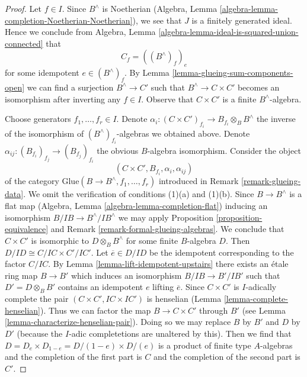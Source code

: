 \documentclass[10pt,a4paper]{amsart}
\theoremstyle{plain}
\theoremstyle{definition}
\theoremstyle{remark}
\numberwithin{equation}{subsection}
\begin{document}
\begin{proof}
Let $f \in I$. Since $B^\wedge$ is Noetherian (Algebra, Lemma
\ref{algebra-lemma-completion-Noetherian-Noetherian}),
we see that $J$ is a finitely generated ideal.
Hence we conclude from
Algebra, Lemma \ref{algebra-lemma-ideal-is-squared-union-connected}
that
$$
C_f = ((B^\wedge)_f)_e
$$
for some idempotent $e \in (B^\wedge)_f$. By
Lemma \ref{lemma-glueing-sum-components-open}
we can find a surjection $B^\wedge \to C'$
such that $B^\wedge \to C \times C'$ becomes an
isomorphism after inverting any $f \in I$.
Observe that $C \times C'$ is a finite $B^\wedge$-algebra.

\medskip\noindent
Choose generators $f_1, \ldots, f_r \in I$. Denote
$\alpha_i : (C \times C')_{f_i} \to B_{f_i} \otimes_B B^\wedge$
the inverse of the isomorphism of $(B^\wedge)_{f_i}$-algebras
we obtained above. Denote $\alpha_{ij} : (B_{f_i})_{f_j} \to (B_{f_j})_{f_i}$
the obvious $B$-algebra isomorphism.
Consider the object
$$
(C \times C', B_{f_i}, \alpha_i, \alpha_{ij})
$$
of the category $\text{Glue}(B \to B^\wedge, f_1, \ldots, f_r)$ introduced
in Remark \ref{remark-glueing-data}. We omit the verification of
conditions (1)(a) and (1)(b).
Since $B \to B^\wedge$ is a flat map
(Algebra, Lemma \ref{algebra-lemma-completion-flat}) inducing an isomorphism
$B/IB \to B^\wedge/IB^\wedge$ we may apply
Proposition \ref{proposition-equivalence}
and Remark \ref{remark-formal-glueing-algebras}.
We conclude that $C \times C'$ is isomorphic to $D \otimes_B B^\wedge$
for some finite $B$-algebra $D$.
Then $D/ID \cong C/IC \times C'/IC'$. Let $\overline{e} \in D/ID$
be the idempotent corresponding to the factor $C/IC$.
By Lemma \ref{lemma-lift-idempotent-upstairs} there exists an
\'etale ring map $B \to B'$ which induces an isomorphism
$B/IB \to B'/IB'$ such that $D' = D \otimes_B B'$ contains an
idempotent $e$ lifting $\overline{e}$. Since $C \times C'$
is $I$-adically complete the pair $(C \times C', IC \times IC')$
is henselian (Lemma \ref{lemma-complete-henselian}).
Thus we can factor the map $B \to C \times C'$ through $B'$ (see
Lemma \ref{lemma-characterize-henselian-pair}).
Doing so we may replace $B$ by $B'$ and $D$ by $D'$ (because the
$I$-adic completetions are unaltered by this). Then
we find that $D = D_e \times D_{1 - e} = D/(1 - e) \times D/(e)$
is a product of finite type $A$-algebras and the completion of the
first part is $C$ and the completion of the second part is $C'$.
\end{proof}
\end{document}
